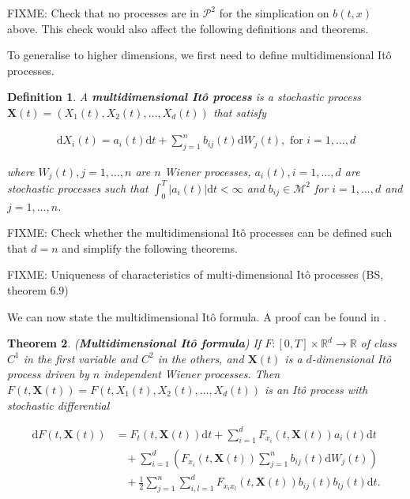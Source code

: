 \documentclass[a4paper]{article}
\newtheorem{definition}{Definition}[section]
\newtheorem{theorem}[definition]{Theorem}
\begin{document}
FIXME: Check that no processes are in $\mathcal{P}^2$ for the simplication on $b(t,x)$ above. This check would also affect the following definitions and theorems.


To generalise to higher dimensions, we first need to define multidimensional It\^o processes.

\begin{definition}
  A \textbf{multidimensional It\^o process} is a stochastic process $\mathbf{X}(t) = (X_1(t), X_2(t), \ldots, X_d(t))$ that satisfy

  \begin{align*}
    \mathrm{d}X_i(t) = a_i(t) \mathrm{d}t + \sum_{j=1}^n b_{ij}(t) \mathrm{d}W_j(t), \text{ for } i=1,\ldots,d
  \end{align*}

  where $W_j(t), j=1,\ldots,n$ are $n$ Wiener processes, $a_i(t), i=1,\ldots,d$ are stochastic processes such that $\int_0^T |a_i(t)| \mathrm{d}t < \infty$ and $b_{ij} \in \mathcal{M}^2$ for $i=1,\ldots,d$ and $j=1,\ldots,n$.
\end{definition}

FIXME: Check whether the multidimensional It\^o processes can be defined such that $d=n$ and simplify the following theorems.

FIXME: Uniqueness of characteristics of multi-dimensional It\^o processes (BS, theorem 6.9)

We can now state the multidimensional It\^o formula. A proof can be found in \textcite{capinski_blackscholes_2012}.

\begin{theorem}\label{thm:ito-formula-multi}
  (\textbf{Multidimensional It\^o formula}) If $F : [0,T] \times \mathbb{R}^d \to \mathbb{R}$ of class $C^1$ in the first variable and $C^2$ in the others, and $\mathbf{X}(t)$ is a $d$-dimensional It\^o process driven by $n$ independent Wiener processes. Then $F(t,\mathbf{X}(t)) = F(t,X_1(t),X_2(t),\ldots,X_d(t))$ is an It\^o process with stochastic differential

  \begin{align*}
    \mathrm{d}F(t,\mathbf{X}(t))
    &= F_t(t,\mathbf{X}(t)) \mathrm{d}t + \sum_{i=1}^d F_{x_i}(t,\mathbf{X}(t)) a_i(t) \mathrm{d}t\\
    &\ \ \ \ + \sum_{i=1}^d \left(F_{x_i}(t,\mathbf{X}(t)) \sum_{j=1}^n b_{ij}(t) \mathrm{d}W_j(t) \right)\\
    &\ \ \ \ + \frac{1}{2} \sum_{j=1}^n \sum_{i,l=1}^d F_{x_i x_l}(t,\mathbf{X}(t)) b_{ij}(t)b_{lj}(t) \mathrm{d}t.
  \end{align*}
\end{theorem}
\end{document}
